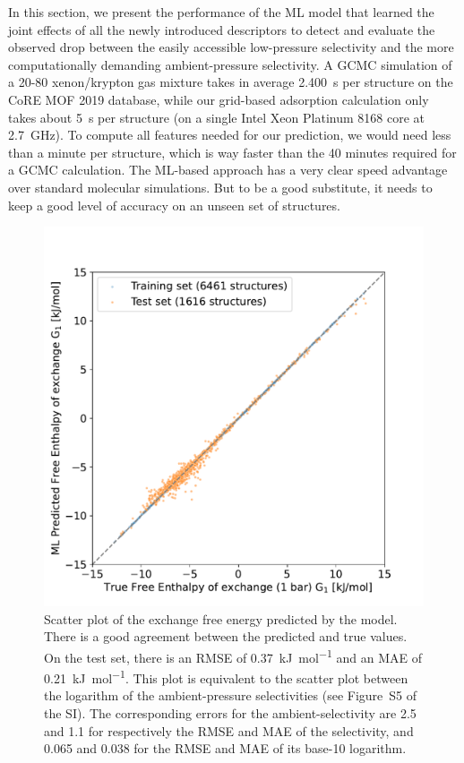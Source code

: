 \documentclass[main]{subfiles}
\begin{document}
In this section, we present the performance of the ML model that learned the joint effects of all the newly introduced descriptors to detect and evaluate the observed drop between the easily accessible low-pressure selectivity and the more computationally demanding ambient-pressure selectivity.
A GCMC simulation of a 20-80 xenon/krypton gas mixture takes in average \SI{2,400}{\second} per structure on the CoRE MOF 2019 database, while our grid-based adsorption calculation only takes about \SI{5}{\second} per structure (on a single Intel Xeon Platinum 8168 core at \SI{2.7}{\giga\hertz}). To compute all features needed for our prediction, we would need less than a minute per structure, which is way faster than the 40 minutes required for a GCMC calculation. The ML-based approach has a very clear speed advantage over standard molecular simulations. But to be a good substitute, it needs to keep a good level of accuracy on an unseen set of structures.

\begin{figure}[ht]
\centering
  \includegraphics[width=0.5\linewidth]{figures/4-ml/main/Scatterplot_G1_prediction.pdf}
  \caption{Scatter plot of the exchange free energy predicted by the model. There is a good agreement between the predicted and true values. On the test set, there is an RMSE of \SI{0.37}{\kilo\joule\per\mole} and an MAE of \SI{0.21}{\kilo\joule\per\mole}. This plot is equivalent to the scatter plot between the logarithm of the ambient-pressure selectivities (see Figure~S5 of the SI). The corresponding errors for the ambient-selectivity are 2.5 and 1.1 for respectively the RMSE and MAE of the selectivity, and 0.065 and 0.038 for the RMSE and MAE of its base-10 logarithm. }
  \label{fgr:G1_prediction}
\end{figure}
\end{document}
